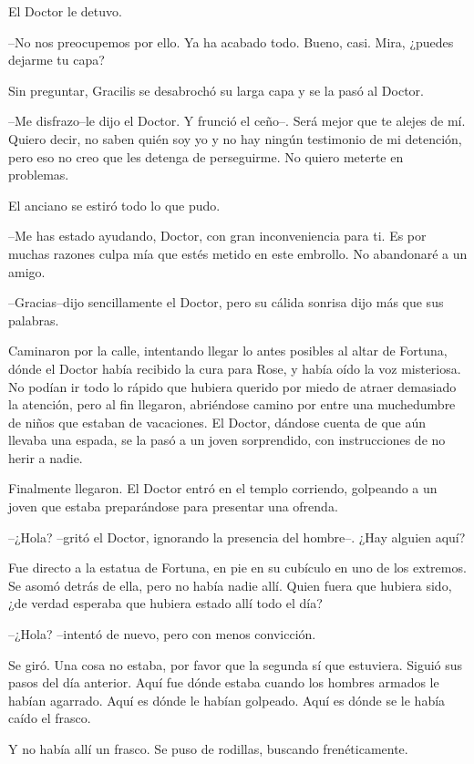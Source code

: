 El Doctor le detuvo.

--No nos preocupemos por ello. Ya ha acabado todo. Bueno, casi. Mira,
¿puedes dejarme tu capa?

Sin preguntar, Gracilis se desabrochó su larga capa y se la pasó al
Doctor.

--Me disfrazo--le dijo el Doctor. Y frunció el ceño--. Será mejor que te
alejes de mí. Quiero decir, no saben quién soy yo y no hay ningún
testimonio de mi detención, pero eso no creo que les detenga de
perseguirme. No quiero meterte en problemas.

El anciano se estiró todo lo que pudo.

--Me has estado ayudando, Doctor, con gran inconveniencia para ti. Es
por muchas razones culpa mía que estés metido en este embrollo. No
abandonaré a un amigo.

--Gracias--dijo sencillamente el Doctor, pero su cálida sonrisa dijo más
que sus palabras.

Caminaron por la calle, intentando llegar lo antes posibles al altar de
Fortuna, dónde el Doctor había recibido la cura para Rose, y había oído
la voz misteriosa. No podían ir todo lo rápido que hubiera querido por
miedo de atraer demasiado la atención, pero al fin llegaron, abriéndose
camino por entre una muchedumbre de niños que estaban de vacaciones. El
Doctor, dándose cuenta de que aún llevaba una espada, se la pasó a un
joven sorprendido, con instrucciones de no herir a nadie.

Finalmente llegaron. El Doctor entró en el templo corriendo, golpeando a
un joven que estaba preparándose para presentar una ofrenda.

--¿Hola? --gritó el Doctor, ignorando la presencia del hombre--. ¿Hay
alguien aquí?

Fue directo a la estatua de Fortuna, en pie en su cubículo en uno de los
extremos. Se asomó detrás de ella, pero no había nadie allí. Quien fuera
que hubiera sido, ¿de verdad esperaba que hubiera estado allí todo el
día?

--¿Hola? --intentó de nuevo, pero con menos convicción.

Se giró. Una cosa no estaba, por favor que la segunda sí que estuviera.
Siguió sus pasos del día anterior. Aquí fue dónde estaba cuando los
hombres armados le habían agarrado. Aquí es dónde le habían golpeado.
Aquí es dónde se le había caído el frasco.

Y no había allí un frasco. Se puso de rodillas, buscando frenéticamente.

